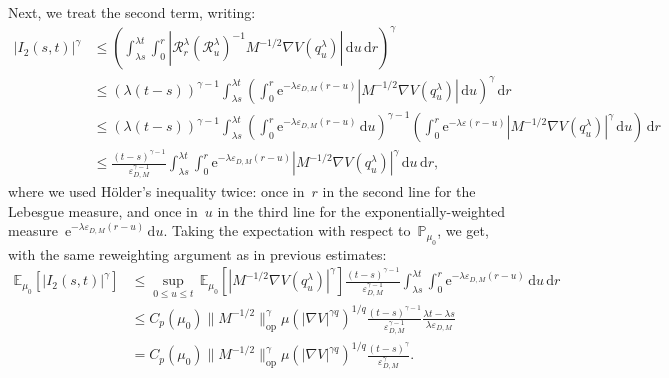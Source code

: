 \documentclass[10pt]{article}
\newcommand{\cR}{\mathcal{R}}
\renewcommand{\d}{\mathrm{d}}
\newcommand{\e}{\mathrm{e}}
\newcommand{\E}{\mathbb{E}}
\renewcommand{\P}{\mathbb{P}}
\newcommand{\1}{\mathbbm 1}
\begin{document}
Next, we treat the second term, writing:
\begin{equation}
    \begin{aligned}
    |I_2(s,t)|^\gamma &\leq \left(\int_{\lambda s}^{\lambda t}\int_{0}^r \left|\cR_r^\lambda(\cR_{u}^\lambda)^{-1} M^{-1/2}\nabla V(q_u^\lambda)\right|\,\d u\,\d r\right)^\gamma\\
    &\leq (\lambda(t-s))^{\gamma-1}\int_{\lambda s}^{\lambda t}\left(\int_0^r \e^{-\lambda\varepsilon_{D,M}(r-u)}|M^{-1/2}\nabla V(q_u^\lambda)|\,\d u\right)^\gamma\,\d r\\
    &\leq (\lambda(t-s))^{\gamma-1}\int_{\lambda s}^{\lambda t}\left(\int_{0}^r \e^{-\lambda\varepsilon_{D,M}(r-u)}\,\d u\right)^{\gamma-1}\left(\int_{0}^r \e^{-\lambda\varepsilon(r-u)}|M^{-1/2}\nabla V(q_u^\lambda)|^\gamma\,\d u\right)\,\d r\\
    &\leq \frac{(t-s)^{\gamma-1}}{\varepsilon_{D,M}^{\gamma-1}}\int_{\lambda s}^{\lambda t}\int_{0}^r \e^{-\lambda\varepsilon_{D,M}(r-u)}|M^{-1/2}\nabla V(q_u^\lambda)|^\gamma\,\d u\,\d r,
    \end{aligned}
\end{equation}
where we used Hölder's inequality twice: once in~$r$ in the second line for the Lebesgue measure, and once in~$u$ in the third line for the exponentially-weighted measure~$\e^{-\lambda\varepsilon_{D,M}(r-u)}\,\d u$.
Taking the expectation with respect to~$\P_{\mu_0}$, we get, with the same reweighting argument as in previous estimates:
\begin{equation}
    \label{eq:i2_estimate}
    \begin{aligned}
    \E_{\mu_0}\left[|I_2(s,t)|^\gamma\right] &\leq \underset{0\leq u\leq t}{\sup}\,\E_{\mu_0}[|M^{-1/2}\nabla V(q_u^\lambda)|^\gamma]\frac{(t-s)^{\gamma-1}}{\varepsilon_{D,M}^{\gamma-1}}\int_{\lambda s}^{\lambda t}\int_0^r \e^{-\lambda \varepsilon_{D,M}(r-u)}\,\d u\,\d r\\
    &\leq C_p(\mu_0)\|M^{-1/2}\|_{\mathrm{op}}^\gamma\mu\left(|\nabla V|^{\gamma q}\right)^{1/q}\frac{(t-s)^{\gamma-1}}{\varepsilon_{D,M}^{\gamma-1}}\frac{\lambda t-\lambda s}{\lambda \varepsilon_{D,M}}\\
    &= C_p(\mu_0)\|M^{-1/2}\|_{\mathrm{op}}^\gamma\mu\left(|\nabla V|^{\gamma q}\right)^{1/q}\frac{(t-s)^\gamma}{\varepsilon_{D,M}^\gamma}.
    \end{aligned}
\end{equation}
\end{document}
